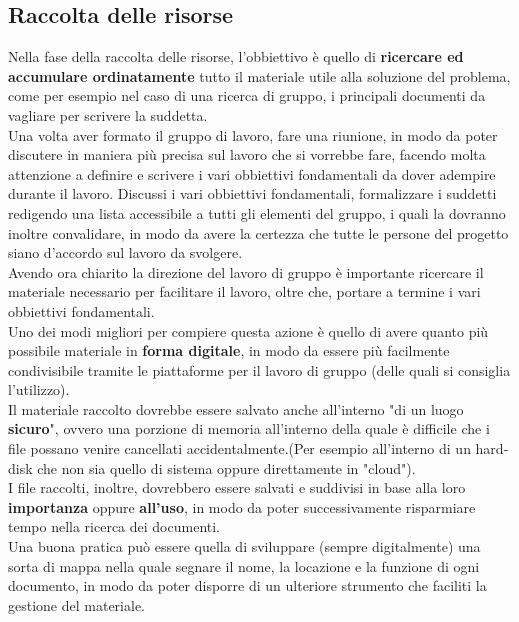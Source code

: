 \documentclass[11pt,a4paper]{article}
\begin{document}
	\subsection{Raccolta delle risorse}
	Nella fase della raccolta delle risorse, l'obbiettivo è quello di \textbf{ricercare ed accumulare ordinatamente} tutto il materiale utile alla soluzione del problema, come per esempio nel caso di una ricerca di gruppo, i principali documenti da vagliare per scrivere la suddetta.\\
	Una volta aver formato il gruppo di lavoro, fare una riunione, in modo da poter discutere in maniera più precisa sul lavoro che si vorrebbe fare, facendo molta attenzione a definire e scrivere i vari obbiettivi fondamentali da dover adempire durante il lavoro. Discussi i vari obbiettivi fondamentali, formalizzare i suddetti redigendo una lista accessibile a tutti gli elementi del gruppo, i quali la dovranno inoltre convalidare, in modo da avere la certezza che tutte le persone del progetto siano d'accordo sul lavoro da svolgere.\\
	Avendo ora chiarito la direzione del lavoro di gruppo è importante ricercare il materiale necessario per facilitare il lavoro, oltre che, portare a termine i vari obbiettivi fondamentali.\\
	Uno dei modi migliori per compiere questa azione è quello di avere quanto più possibile materiale in \textbf{forma digitale}, in modo da essere più facilmente condivisibile tramite le piattaforme per il lavoro di gruppo (delle quali si consiglia l'utilizzo).\\
	Il materiale raccolto dovrebbe essere salvato anche all'interno "di un luogo \textbf{sicuro}", ovvero una porzione di memoria all'interno della quale è difficile che i file possano venire cancellati accidentalmente.(Per esempio all'interno di un hard-disk che non sia quello di sistema oppure direttamente in "cloud").\\
	I file raccolti, inoltre, dovrebbero essere salvati e suddivisi in base alla loro \textbf{importanza} oppure \textbf{all'uso}, in modo da poter successivamente risparmiare tempo nella ricerca dei documenti.\\
	Una buona pratica può essere quella di sviluppare (sempre digitalmente) una sorta di mappa nella quale segnare il nome, la locazione e la funzione di ogni documento, in modo da poter disporre di un ulteriore strumento che faciliti la gestione del materiale.\\
	
\end{document}

